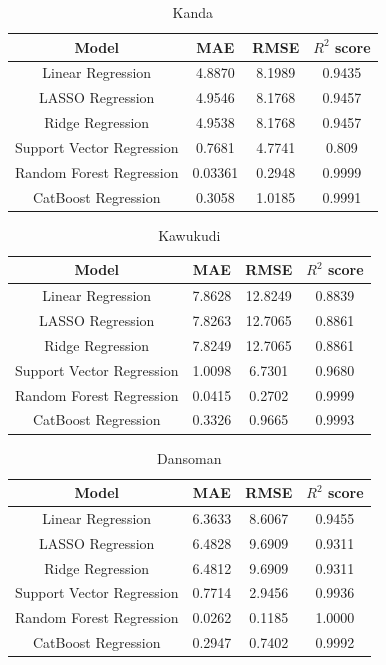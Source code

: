 \documentclass{book}
\numberwithin{equation}{section}
\numberwithin{figure}{section}
\begin{document}
\begin{table}[H]
    \centering
    \begin{tabular}{|c|c|c|c|}
        \hline
        Model & MAE & RMSE & $R^2$ score \\
        \hline
        Linear Regression & 4.8870 & 8.1989 & 0.9435 \\
        \hline
        LASSO Regression & 4.9546 & 8.1768 & 0.9457 \\
        \hline
        Ridge Regression & 4.9538 & 8.1768 & 0.9457 \\
        \hline
        Support Vector Regression & 0.7681 & 4.7741 & 0.809 \\
        \hline
        Random Forest Regression & 0.03361 & 0.2948 & 0.9999 \\
        \hline
        CatBoost Regression & 0.3058 & 1.0185 & 0.9991 \\\hline
    \end{tabular}
    \caption{Kanda}
   \label{tab: all algorithms on Kanda}
\end{table}
\begin{table}[H]
    \centering
    \begin{tabular}{|c|c|c|c|}
        \hline
        Model & MAE & RMSE & $R^2$ score \\
        \hline
        Linear Regression &7.8628 & 12.8249 & 0.8839 \\
        \hline
        LASSO Regression & 7.8263 & 12.7065 & 0.8861 \\
        \hline
        Ridge Regression & 7.8249 & 12.7065 & 0.8861 \\
        \hline
        Support Vector Regression & 1.0098 & 6.7301 & 0.9680 \\
        \hline
        Random Forest Regression & 0.0415 & 0.2702 & 0.9999 \\
        \hline
        CatBoost Regression & 0.3326 & 0.9665 & 0.9993 \\\hline
    \end{tabular}
    \caption{Kawukudi}
   \label{tab: all algorithms combined on Kawukudi}
\end{table}
\begin{table}[H]
    \centering
    \begin{tabular}{|c|c|c|c|}
        \hline
        Model & MAE & RMSE & $R^2$ score \\
        \hline
        Linear Regression & 6.3633 & 8.6067 & 0.9455 \\
        \hline
        LASSO Regression & 6.4828 & 9.6909 & 0.9311 \\
        \hline
        Ridge Regression & 6.4812 & 9.6909 & 0.9311 \\
        \hline
        Support Vector Regression & 0.7714 & 2.9456 & 0.9936 \\
        \hline
        Random Forest Regression & 0.0262 & 0.1185 & 1.0000 \\
        \hline
        CatBoost Regression & 0.2947 & 0.7402 & 0.9992 \\\hline
    \end{tabular}
    \caption{Dansoman}
   \label{tab: all algorithms' metrics on Dansoman}
\end{table}
\end{document}
